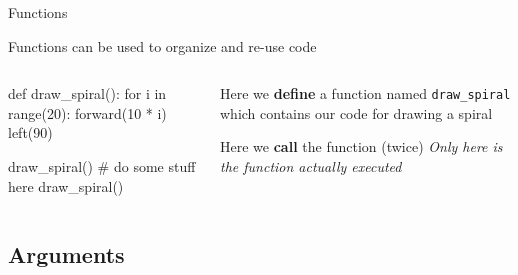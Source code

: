 \begin{frame}[fragile]{Functions}

    \vspace{-1em}

    \begin{block}{}
        Functions can be used to organize and re-use code
    \end{block}

    \vspace{1em}

    \begin{columns}[totalwidth=\textwidth]

    \begin{column}{0.5\textwidth}

        \vspace{-0.4em}

        \begin{pythoncode}
def draw_spiral():
    for i in range(20):
        forward(10 * i)
        left(90)

draw_spiral()
# do some stuff here
draw_spiral()
        \end{pythoncode}

    \end{column}

    \begin{column}{0.5\textwidth}

        \begin{alertblock}{}
            Here we \textbf{define} a function named \texttt{draw\_spiral} which contains our code for drawing a spiral
        \end{alertblock}

        \begin{alertblock}{}
            Here we \textbf{call} the function (twice) \textit{Only here is the function actually executed}
        \end{alertblock}

    \end{column}

    \end{columns}

\end{frame}

\subsection{Arguments}

